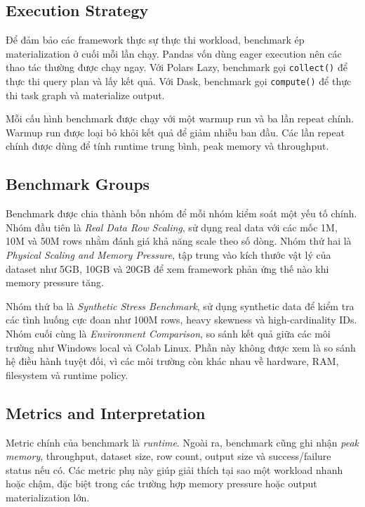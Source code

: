 \documentclass[12pt,a4paper]{article}
\begin{document}
\subsection{Execution Strategy}

Để đảm bảo các framework thực sự thực thi workload, benchmark ép materialization ở cuối mỗi lần chạy. Pandas vốn dùng eager execution nên các thao tác thường được chạy ngay. Với Polars Lazy, benchmark gọi \texttt{collect()} để thực thi query plan và lấy kết quả. Với Dask, benchmark gọi \texttt{compute()} để thực thi task graph và materialize output.

Mỗi cấu hình benchmark được chạy với một warmup run và ba lần repeat chính. Warmup run được loại bỏ khỏi kết quả để giảm nhiễu ban đầu. Các lần repeat chính được dùng để tính runtime trung bình, peak memory và throughput.

\subsection{Benchmark Groups}

Benchmark được chia thành bốn nhóm để mỗi nhóm kiểm soát một yếu tố chính. Nhóm đầu tiên là \textit{Real Data Row Scaling}, sử dụng real data với các mốc 1M, 10M và 50M rows nhằm đánh giá khả năng scale theo số dòng. Nhóm thứ hai là \textit{Physical Scaling and Memory Pressure}, tập trung vào kích thước vật lý của dataset như 5GB, 10GB và 20GB để xem framework phản ứng thế nào khi memory pressure tăng.

Nhóm thứ ba là \textit{Synthetic Stress Benchmark}, sử dụng synthetic data để kiểm tra các tình huống cực đoan như 100M rows, heavy skewness và high-cardinality IDs. Nhóm cuối cùng là \textit{Environment Comparison}, so sánh kết quả giữa các môi trường như Windows local và Colab Linux. Phần này không được xem là so sánh hệ điều hành tuyệt đối, vì các môi trường còn khác nhau về hardware, RAM, filesystem và runtime policy.

\subsection{Metrics and Interpretation}

Metric chính của benchmark là \textit{runtime}. Ngoài ra, benchmark cũng ghi nhận \textit{peak memory}, throughput, dataset size, row count, output size và success/failure status nếu có. Các metric phụ này giúp giải thích tại sao một workload nhanh hoặc chậm, đặc biệt trong các trường hợp memory pressure hoặc output materialization lớn.
\end{document}
